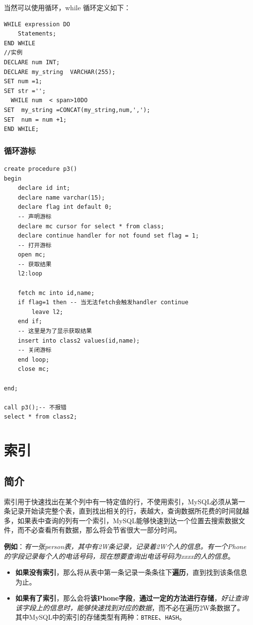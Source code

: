 \documentclass[UTF8,a4paper,12pt]{ctexbook}
\begin{document}
			当然可以使用循环，while 循环定义如下：
			\begin{lstlisting}
WHILE expression DO
    Statements;
END WHILE
//实例
DECLARE num INT;
DECLARE my_string  VARCHAR(255);
SET num =1;
SET str ='';
  WHILE num  < span>10DO
SET  my_string =CONCAT(my_string,num,',');
SET  num = num +1;
END WHILE;		
			\end{lstlisting}
	
		\subsection{循环游标}	
			\begin{lstlisting}
create procedure p3()
begin
    declare id int;
    declare name varchar(15);
    declare flag int default 0;
    -- 声明游标
    declare mc cursor for select * from class;
    declare continue handler for not found set flag = 1;
    -- 打开游标
    open mc;
    -- 获取结果
    l2:loop 
    
    fetch mc into id,name;
    if flag=1 then -- 当无法fetch会触发handler continue
        leave l2;
    end if;
    -- 这里是为了显示获取结果
    insert into class2 values(id,name);
    -- 关闭游标
    end loop;
    close mc;
    
end;

call p3();-- 不报错
select * from class2;	
			\end{lstlisting}
			
	
\chapter{索引}
	\section{简介}
		索引用于快速找出在某个列中有一特定值的行，不使用索引，MySQL必须从第一条记录开始读完整个表，直到找出相关的行，表越大，查询数据所花费的时间就越多，如果表中查询的列有一个索引，MySQL能够快速到达一个位置去搜索数据文件，而不必查看所有数据，那么将会节省很大一部分时间。

		\textbf{例如}：\textit{有一张person表，其中有2W条记录，记录着2W个人的信息。有一个Phone的字段记录每个人的电话号码，现在想要查询出电话号码为xxxx的人的信息}。
			\begin{itemize}
				\item \textbf{如果没有索引}，那么将从表中第一条记录一条条往下\textbf{遍历}，直到找到该条信息为止。
				\item \textbf{如果有了索引}，那么会将\textbf{该Phone字段}，\textbf{通过一定的方法进行存储}，\textit{好让查询该字段上的信息时，能够快速找到对应的数据}，而不必在遍历2W条数据了。其中MySQL中的索引的存储类型有两种：\verb|BTREE|、\verb|HASH|。
			\end{itemize}
			
\end{document}
